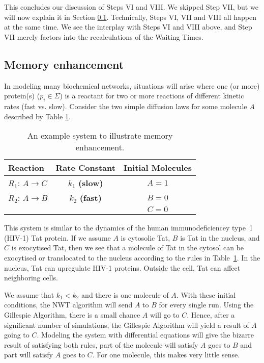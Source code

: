 \documentclass[copyright]{eptcs}
\newcommand{\ra}{\rightarrow}
\begin{document}
This concludes our discussion of Steps VI and VIII.  We skipped Step VII, but we will now explain it in Section \ref{memenhance}.  Technically, Steps VI, VII and VIII all happen at the same time.  We see the interplay with Steps VI and VIII above, and Step VII merely factors into the recalculations of the Waiting Times.

\subsection{Memory enhancement}\label{memenhance}

In modeling many biochemical networks, situations will arise where one (or more) protein(s) 
($p_i\in \Sigma$) is a reactant for two or more reactions of different kinetic rates 
(fast vs. slow).  Consider the two simple diffusion laws for some molecule $A$ described by 
Table \ref{simptab}.

{\renewcommand{\arraystretch}{1.2}\begin{table}[h!t!p!]
\centering
\caption{An example system to illustrate memory enhancement.} \label{simptab}\vspace*{1mm}
\begin{tabular}{|l|c|c|}
\hline
Reaction & Rate Constant & Initial Molecules\\
\hline
$R_1$: $A\ra C$ & $k_1$ {\bf(slow)} & $A = 1$\\
\hline
$R_2$: $A\ra B$ & $k_2$ {\bf(fast)} & $B = 0$\\
\hline
& & $C = 0$\\
\hline
\end{tabular}
\end{table}}

This system is similar to the dynamics of the human immunodeficiencey type~1 (HIV-1) Tat protein.  If we assume $A$ is cytosolic Tat, $B$ is Tat in the nucleus, and $C$ is exocytised Tat, then we see that a molecule of Tat in the cytosol can be exocytised or translocated to the nucleus \cite{selliah01} according to the rules in Table~\ref{simptab}.  In the nucleus, Tat can upregulate HIV-1 proteins.  Outside the cell, Tat can affect neighboring cells.

We assume that $k_1<k_2$ and there is one molecule of $A$.  With these initial conditions, the NWT algorithm will send $A$ to $B$ for every single run.  Using the Gillespie Algorithm, there is a small chance $A$ will go to $C$.  Hence, after a significant number of simulations, the Gillespie Algorithm will yield a result of $A$ going to $C$. Modeling the system with differential equations will give the bizarre result of satisfying both rules, part of the molecule will satisfy $A$ goes to $B$ and part will satisfy $A$ goes to $C$.  For one molecule, this makes very little sense.
\end{document}
